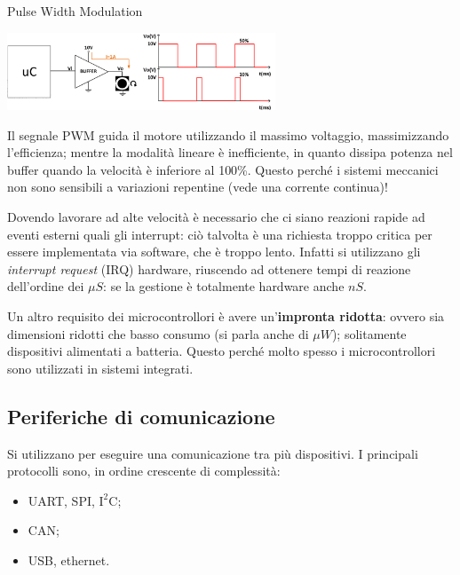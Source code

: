 \documentclass[
]{book}
\providecommand{\tightlist}{%
  \setlength{\itemsep}{0pt}\setlength{\parskip}{0pt}}
\begin{document}
\begin{redbox}{Pulse Width Modulation}
\begin{center}
\begin{minipage}[c]{0.8\linewidth}
\center\includegraphics[width=0.6\textwidth]{assets/imgs/pwm_mode.png}
\end{minipage}
\end{center}


Il segnale PWM guida il motore utilizzando il massimo voltaggio,
massimizzando l'efficienza; mentre la modalità lineare è inefficiente,
in quanto dissipa potenza nel buffer quando la velocità è inferiore al
100\%. Questo perché i sistemi meccanici non sono sensibili a variazioni
repentine (vede una corrente continua)!
\end{redbox}

Dovendo lavorare ad alte velocità è necessario che ci siano reazioni
rapide ad eventi esterni quali gli interrupt: ciò talvolta è una
richiesta troppo critica per essere implementata via software, che è
troppo lento. Infatti si utilizzano gli \emph{interrupt request} (IRQ)
hardware, riuscendo ad ottenere tempi di reazione dell'ordine dei
\(\mu S\): se la gestione è totalmente hardware anche \(nS\).

Un altro requisito dei microcontrollori è avere un'\textbf{impronta
ridotta}: ovvero sia dimensioni ridotti che basso consumo (si parla
anche di \(\mu W\)); solitamente dispositivi alimentati a batteria.
Questo perché molto spesso i microcontrollori sono utilizzati in sistemi
integrati.

\subsection{Periferiche di
comunicazione}\label{periferiche-di-comunicazione}

Si utilizzano per eseguire una comunicazione tra più dispositivi. I
principali protocolli sono, in ordine crescente di complessità:

\begin{itemize}
\tightlist
\item
  UART, SPI, \(\text{I}^2\text{C}\);
\item
  CAN;
\item
  USB, ethernet.
\end{itemize}
\end{document}
